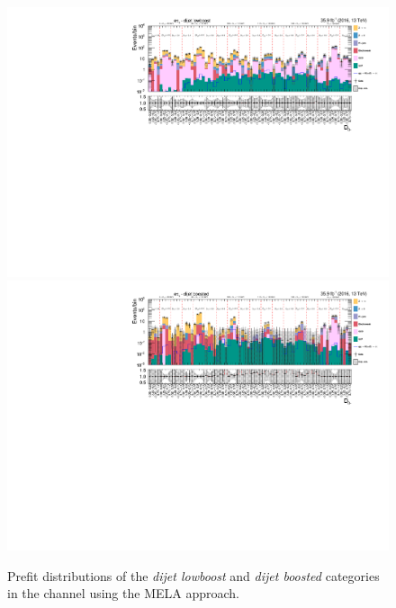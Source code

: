 \begin{figure}[h!]
    \centering      
        \includegraphics[width=\textwidth]{Figures/statana/Postfit_JEC_mela3D/prefit_htt_et_3_13TeV.pdf}\\
        \includegraphics[width=\textwidth]{Figures/statana/Postfit_JEC_mela3D/prefit_htt_et_4_13TeV.pdf}
    \caption{Prefit distributions of the \textit{dijet lowboost} and \textit{dijet boosted} categories in the \etau{} channel  using the MELA approach.}
\end{figure}
\clearpage
